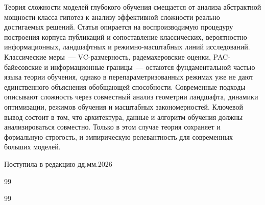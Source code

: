 \documentclass[russian]{intsys}
\begin{document}
Теория сложности моделей глубокого обучения смещается от анализа абстрактной мощности класса гипотез к анализу эффективной сложности реально достигаемых решений.
Статья опирается на воспроизводимую процедуру построения корпуса публикаций и сопоставление классических, вероятностно-информационных, ландшафтных и режимно-масштабных линий исследований.
Классические меры~--- VC-размерность, радемахеровские оценки, PAC-байесовские и информационные границы~--- остаются фундаментальной частью языка теории обучения, однако в перепараметризованных режимах уже не дают единственного объяснения обобщающей способности.
Современные подходы описывают сложность через совместный анализ геометрии ландшафта, динамики оптимизации, режимов обучения и масштабных закономерностей.
Ключевой вывод состоит в том, что архитектура, данные и алгоритм обучения должны анализироваться совместно. Только в этом случае теория сохраняет и формальную строгость, и эмпирическую релевантность для современных больших моделей.


\begin{flushright}
Поступила в редакцию дд.мм.2026
\end{flushright}

\begin{thebibliographyRU}{99}

\end{thebibliographyRU}

\begin{thebibliographyEN}{99}

\end{thebibliographyEN}
\end{document}
